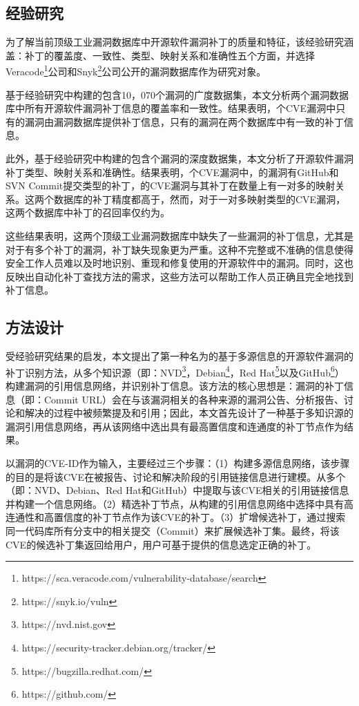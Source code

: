 \subsection{经验研究}
为了解当前顶级工业漏洞数据库中开源软件漏洞补丁的质量和特征，该经验研究涵盖：补丁的覆盖度、一致性、类型、映射关系和准确性五个方面，并选择Veracode\footnote{https://sca.veracode.com/vulnerability-database/search}公司和Snyk\footnote{https://snyk.io/vuln}公司公开的漏洞数据库作为研究对象。

基于经验研究中构建的包含10，070个漏洞的广度数据集，本文分析两个漏洞数据库中所有开源软件漏洞补丁信息的覆盖率和一致性。结果表明，个CVE漏洞中只有的漏洞由漏洞数据库提供补丁信息，只有的漏洞在两个数据库中有一致的补丁信息。%

此外，基于经验研究中构建的包含个漏洞的深度数据集，本文分析了开源软件漏洞补丁类型、映射关系和准确性。结果表明，个CVE漏洞中，的漏洞有GitHub和SVN Commit提交类型的补丁，的CVE漏洞与其补丁在数量上有一对多的映射关系。这两个数据库的补丁精度都高于，然而，对于一对多映射类型的CVE漏洞，这两个数据库中补丁的召回率仅约为。

这些结果表明，这两个顶级工业漏洞数据库中缺失了一些漏洞的补丁信息，尤其是对于有多个补丁的漏洞，补丁缺失现象更为严重。这种不完整或不准确的信息使得安全工作人员难以及时地识别、重现和修复使用的开源软件中的漏洞。同时，这也反映出自动化补丁查找方法的需求，这些方法可以帮助工作人员正确且完全地找到补丁信息。

\subsection{方法设计}
受经验研究结果的启发，本文提出了第一种名为\tool 的基于多源信息的开源软件漏洞的补丁识别方法，从多个知识源（即：NVD\footnote{https://nvd.nist.gov}，Debian\footnote{https://security-tracker.debian.org/tracker/}，Red Hat\footnote{https://bugzilla.redhat.com/}以及GitHub\footnote{https://github.com/}）构建漏洞的引用信息网络，并识别补丁信息。该方法的核心思想是：漏洞的补丁信息（即：Commit URL）会在与该漏洞相关的各种来源的漏洞公告、分析报告、讨论和解决的过程中被频繁提及和引用；因此，本文首先设计了一种基于多知识源的漏洞引用信息网络，再从该网络中选出具有最高置信度和连通度的补丁节点作为结果。

\tool 以漏洞的CVE-ID作为输入，主要经过三个步骤：（1）构建多源信息网络，该步骤的目的是将该CVE在被报告、讨论和解决阶段的引用链接信息进行建模。\tool 从多个（即：NVD、Debian、Red Hat和GitHub）中提取与该CVE相关的引用链接信息并构建一个信息网络。（2）精选补丁节点，\tool 从构建的引用信息网络中选择中具有高连通性和高置信度的补丁节点作为该CVE的补丁。（3）扩增候选补丁，\tool 通过搜索同一代码库所有分支中的相关提交（Commit）来扩展候选补丁集。最终，\tool 将该CVE的候选补丁集返回给用户，用户可基于\tool 提供的信息选定正确的补丁。

